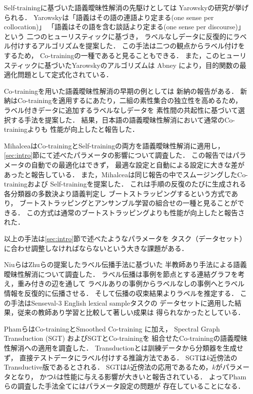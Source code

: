 \documentclass[japanese]{jnlp_1.4}
\begin{document}
Self-trainingに基づいた語義曖昧性解消の先駆けとしては
Yarowskyの研究\cite{Yarowsky95}が挙げられる．
Yarowskyは「語義はその語の連語より定まる(one sense per collocation)」
「語義はその語を含む談話より定まる(one sense per discourse)」という
二つのヒューリスティックに基づき，
ラベルなしデータに反復的にラベル付けするアルゴリズムを提案した．
この手法は二つの観点からラベル付けをするため，
Co-trainingの一種であると見ることもできる．
また，このヒューリスティックに基づいたYarowskyのアルゴリズムは
Abney \cite{Abney04}により，目的関数の最適化問題として定式化されている．

Co-trainingを用いた語義曖昧性解消の早期の例としては
新納の報告\cite{Shinnou01a}がある．
新納はCo-trainingを適用するにあたり，二組の素性集合の独立性を高めるため，
ラベル付きデータに追加するラベルなしデータを
素性間の共起性に基づいて選択する手法を提案した．
結果，日本語の語義曖昧性解消において通常のCo-trainingよりも
性能が向上したと報告した．

MihalceaはCo-trainingとSelf-trainingの両方を語義曖昧性解消に適用し，
\ref{sec:intro}節にて述べたパラメータの影響について調査した\cite{Mihalcea04a}．
この報告ではパラメータの自動での最適化はできず，
最適な設定と自動による設定に大きな差があったと報告している．
また，Mihalceaは同じ報告の中でスムージングしたCo-trainingおよび
Self-trainingを提案した．
これは手順の反復のたびに生成される各分類器の多数決より語義判定し
ブートストラッピングするという方式であり，
ブートストラッピングとアンサンブル学習の組合せの一種と見ることができる．
この方式は通常のブートストラッピングよりも性能が向上したと報告された．

以上の手法は\ref{sec:intro}節で述べたようなパラメータを
タスク（データセット）に合わせ調整しなければならないという大きな課題がある．

NiuらはZhuらの提案したラベル伝播手法\cite{Zhu02}に基づいた
半教師あり手法による語義曖昧性解消について調査した\cite{Niu05}．
ラベル伝播は事例を節点とする連結グラフを考え，重み付きの辺を通して
ラベルありの事例からラベルなしの事例へとラベル情報を反復的に伝播させる．
そして伝播の収束結果よりラベルを推定する．
この手法はSenseval-3 \cite{Mihalcea04b} English lexical sampleタスクの
データセットに適用した結果，従来の教師あり学習と比較して著しい成果は
得られなかったとしている．

PhamらはCo-trainingとSmoothed Co-training \cite{Mihalcea04a}に加え，
Spectral Graph Transduction (SGT) \cite{Joachims03}およびSGTとCo-trainingを
組合せたCo-trainingの語義曖昧性解消への適用を調査した\cite{Pham05}．
Transductionとは訓練データから分類器を生成せず，
直接テストデータにラベル付けする推論方法である\cite{Vapnik98}．
SGTは$k$近傍法のTransductive版であるとされる．
SGTは$k$近傍法の応用であるため，$k$がパラメータとなり，
かつ$k$は性能に与える影響が大きいと報告されている．
よってPhamらの調査した手法全てにはパラメータ設定の問題が
存在していることになる．
\end{document}
